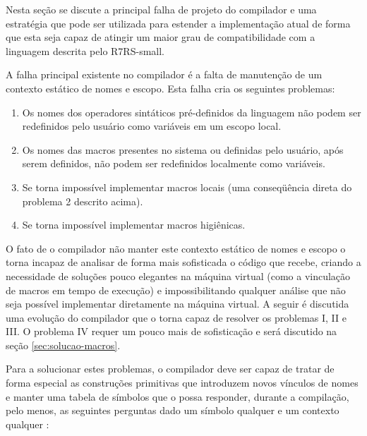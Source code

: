 Nesta seção se discute a principal falha de projeto do compilador e uma
estratégia que pode ser utilizada para estender a implementação atual de forma
que esta seja capaz de atingir um maior grau de compatibilidade com a linguagem
descrita pelo \acs{R7RS}-small.

A falha principal existente no compilador é a falta de manutenção de um
contexto estático de nomes e escopo. Esta falha cria os seguintes problemas:

\begin{enumerate}[I]

 \item Os nomes dos operadores sintáticos pré-definidos da linguagem não podem
ser redefinidos pelo usuário como variáveis em um escopo local.

 \item Os nomes das macros presentes no sistema ou definidas pelo usuário, após
serem definidos, não podem ser redefinidos localmente como variáveis.

 \item Se torna impossível implementar macros locais (uma conseqüência direta
do problema 2 descrito acima).
 
 \item Se torna impossível implementar macros higiênicas.

\end{enumerate}


O fato de o compilador não manter este contexto estático de nomes e escopo o
torna incapaz de analisar de forma mais sofisticada o código que recebe,
criando a necessidade de soluções pouco elegantes na máquina virtual (como a
vinculação de macros em tempo de execução) e impossibilitando qualquer análise
que não seja possível implementar diretamente na máquina virtual. A seguir é
discutida uma evolução do compilador que o torna capaz de resolver os problemas
I, II e III. O problema IV requer um pouco mais de sofisticação e será
discutido na seção \ref{sec:solucao-macros}.

Para a solucionar estes problemas, o compilador deve ser capaz de tratar de
forma especial as construções primitivas que introduzem novos vínculos de nomes
e manter uma tabela de símbolos que o possa responder, durante a compilação,
pelo menos, as seguintes perguntas dado um símbolo qualquer  e um
contexto qualquer :


